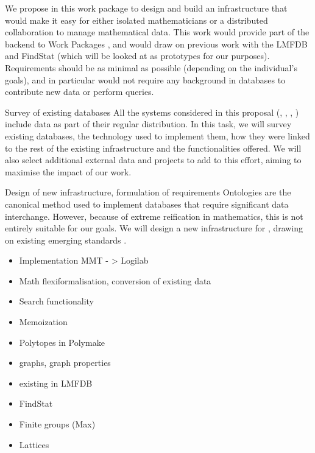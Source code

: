 \begin{Workpackage}{\thewpno}
\begin{WPDescription}
We propose in this work package to design and build an infrastructure that would make it easy for either isolated mathematicians or a distributed collaboration to manage mathematical data. This work would provide part of the backend to Work Packages , and would draw on previous work with the LMFDB and FindStat (which will be looked at as prototypes for our purposes). Requirements should be as minimal as possible (depending on the individual's goals), and in particular would not require any background in databases to contribute new data or perform queries. 
\end{WPDescription}

\begin{task}{Survey of existing databases}
\label{task:data_assessment}
All the systems considered in this proposal (\GAP, \Sage, \Pari, \Singular) include data as part of their regular distribution. In this task, we will survey existing databases, the technology used to implement them, how they were linked to the rest of the existing infrastructure and the functionalities offered. We will also select additional external data and projects to add to this effort, aiming to maximise the impact of our work. 
\end{task}

\begin{task}{Design of new infrastructure, formulation of requirements}
\label{task:data_design}
Ontologies are the canonical method used to implement databases that require significant data interchange. However, because of extreme reification in mathematics, this is not entirely suitable for our goals. We will design a new infrastructure for \TheProject, drawing on existing emerging standards . 


\begin{itemize}
\item Implementation MMT - > Logilab
\item Math flexiformalisation, conversion of existing data
\item Search functionality
\item Memoization
\end{itemize}

  \begin{itemize}
  \item Polytopes in Polymake
  \item graphs, graph properties
  \item existing in LMFDB
  \item FindStat
  \item Finite groups (Max)
  \item Lattices
  \end{itemize}



\end{task}
\end{Workpackage}
